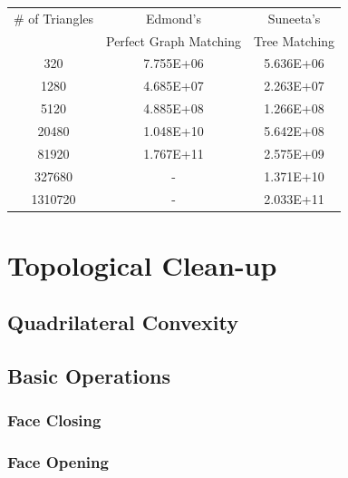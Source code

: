 \documentclass[11pt, a4paper]{paper}
\begin{document}
\begin{table}[h]
\begin{center}
\begin{tabular}{|c|c|c|} 
\hline \# of Triangles &  Edmond's       & Suneeta's     \\
               & Perfect Graph Matching  & Tree Matching  \\ 
\hline  320    &   7.755E+06             & 5.636E+06      \\
\hline  1280   &   4.685E+07             & 2.263E+07       \\
\hline  5120   &   4.885E+08             & 1.266E+08       \\
\hline  20480  &   1.048E+10             & 5.642E+08       \\
\hline  81920  &   1.767E+11             & 2.575E+09       \\
\hline  327680 &      -                  & 1.371E+10       \\
\hline  1310720 &      -                 & 2.033E+11       \\
\hline
\end{tabular}
\end{center}
\end{table}







\section { Topological Clean-up}
\subsection{ Quadrilateral Convexity }
\subsection{ Basic Operations}
\subsubsection{ Face Closing }
\subsubsection{ Face Opening }
\end{document}
